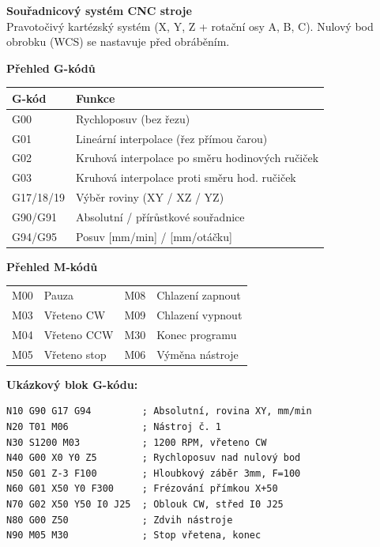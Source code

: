 \documentclass[a4paper,10pt]{article}
\begin{document}
\begin{vysvetlenibox}
\textbf{Souřadnicový systém CNC stroje}\\
Pravotočivý kartézský systém (X, Y, Z + rotační osy A, B, C).
Nulový bod obrobku (WCS) se nastavuje před obráběním.

\textbf{Přehled G-kódů}

\begin{center}
\begin{tabularx}{0.95\linewidth}{@{} l X @{}}
    \toprule
    \textbf{G-kód} & \textbf{Funkce} \\
    \midrule
    G00 & Rychloposuv (bez řezu) \\
    G01 & Lineární interpolace (řez přímou čarou) \\
    G02 & Kruhová interpolace po směru hodinových ručiček \\
    G03 & Kruhová interpolace proti směru hod. ručiček \\
    G17/18/19 & Výběr roviny (XY / XZ / YZ) \\
    G90/G91 & Absolutní / přírůstkové souřadnice \\
    G94/G95 & Posuv [mm/min] / [mm/otáčku] \\
    \bottomrule
\end{tabularx}
\end{center}

\textbf{Přehled M-kódů}

\begin{center}
\begin{tabular}{@{} l l @{\quad} l l @{}}
    \toprule
    M00 & Pauza & M08 & Chlazení zapnout \\
    M03 & Vřeteno CW & M09 & Chlazení vypnout \\
    M04 & Vřeteno CCW & M30 & Konec programu \\
    M05 & Vřeteno stop & M06 & Výměna nástroje \\
    \bottomrule
\end{tabular}
\end{center}

\textbf{Ukázkový blok G-kódu:}
\begin{vzorcebox}
\begin{verbatim}
N10 G90 G17 G94         ; Absolutní, rovina XY, mm/min
N20 T01 M06             ; Nástroj č. 1
N30 S1200 M03           ; 1200 RPM, vřeteno CW
N40 G00 X0 Y0 Z5        ; Rychloposuv nad nulový bod
N50 G01 Z-3 F100        ; Hloubkový záběr 3mm, F=100
N60 G01 X50 Y0 F300     ; Frézování přímkou X+50
N70 G02 X50 Y50 I0 J25  ; Oblouk CW, střed I0 J25
N80 G00 Z50             ; Zdvih nástroje
N90 M05 M30             ; Stop vřetena, konec
\end{verbatim}
\end{vzorcebox}


\end{vysvetlenibox}
\end{document}
